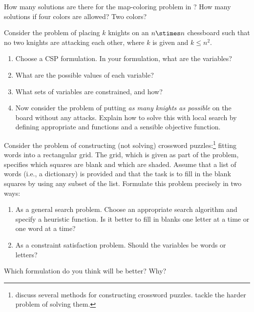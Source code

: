 
\begin{exercise}
How many solutions are there for the map-coloring problem in ?
How many solutions if four colors are allowed?  Two colors?
\end{exercise} 

\begin{uexercise}%
Consider the problem of placing \(k\) knights on an \(n\stimes n\) chessboard 
such that no two knights are attacking each other, where \(k\) is given
and \(k\leq n^2\).
\begin{enumerate}
\item Choose a CSP formulation. In your formulation, what are the variables?
\item What are the possible values of each variable?
\item What sets of variables are constrained, and how?
\item Now consider the problem of putting {\em as many knights as possible}
on the board without any attacks. Explain how to solve this with local search by defining appropriate  and  functions
and a sensible objective function.
\end{enumerate}
\end{uexercise} 

\begin{exercise}%
Consider the problem of constructing (not solving) crossword puzzles:\footnote{ discuss several methods
for constructing crossword puzzles.   tackle the harder 
problem of solving them.} fitting words into a rectangular grid.  
The grid, which is given as part of the problem, specifies which squares are 
blank and which are shaded.  Assume that a list of words (i.e., a 
dictionary) is provided and that the task is to fill in the blank squares 
by using any subset of the list.  Formulate this problem precisely in two ways:
\begin{enumerate}
\item As a general search problem. Choose an appropriate search algorithm
and specify a heuristic function.  Is it better to fill in blanks one letter at a time or one word
at a time?
\item As a constraint satisfaction problem. Should the variables be words or 
letters?
\end{enumerate}
Which formulation do you think will be better?  Why?
\end{exercise} 

